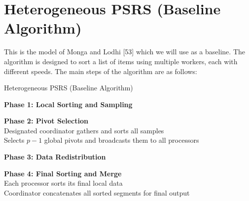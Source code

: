 \documentclass[]{interact}
\theoremstyle{plain}
\theoremstyle{definition}
\theoremstyle{remark}
\begin{document}
\section{Heterogeneous PSRS (Baseline Algorithm)}

This is the model of Monga and Lodhi [53] which we will use as a baseline. The algorithm is designed to sort a list of items using multiple workers, each with different speeds. The main steps of the algorithm are as follows:

\begin{algorithm}[H]
\caption{Heterogeneous PSRS (Baseline Algorithm)}

\textbf{Phase 1: Local Sorting and Sampling} \\

\textbf{Phase 2: Pivot Selection} \\
Designated coordinator gathers and sorts all samples \\
Selects $p - 1$ global pivots and broadcasts them to all processors

\textbf{Phase 3: Data Redistribution} \\

\textbf{Phase 4: Final Sorting and Merge} \\
Each processor sorts its final local data \\
Coordinator concatenates all sorted segments for final output
\end{algorithm}
\end{document}

